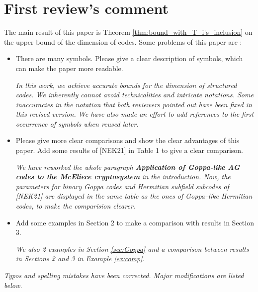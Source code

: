 \documentclass[12pt,a4paper]{amsart}
\begin{document}
\section*{First review's comment}

The main result of this paper is Theorem \ref{thm:bound_with_T_i's_inclusion} on the upper bound of the dimension of codes. Some problems
of this paper are :
\begin{itemize}
\item  There are many symbols. Please give a clear description of symbols, which can make the paper more readable.

\textit{In this work, we achieve accurate bounds for the dimension of structured codes. We inherently cannot avoid technicalities and intricate notations. Some inaccuracies in the notation that both reviewers pointed out have been fixed in this revised version. We have also made an effort to add references to the first occurrence of symbols when reused later.}


\item  Please give more clear comparisons and show the clear advantages of this paper. Add some results of [NEK21] in Table 1 to give a clear comparison.

\textit{We have reworked the whole paragraph \textbf{Application of Goppa-like AG codes to the McEliece cryptosystem} in the introduction. Now, the parameters for binary Goppa codes and Hermitian subfield subcodes of [NEK21] are displayed in the same table as the ones of Goppa--like Hermitian codes, to make the comparision clearer.}
	
	\item Add some examples in Section 2 to make a comparison with results in Section 3. 
	
	\textit{We also 2 examples in Section \ref{sec:Goppa} and a comparison between results in Sections 2 and 3 in Example \ref{ex:comp}.}

\end{itemize}

\textit{Typos and spelling mistakes have been corrected. Major modifications are listed below.} \\
\end{document}
